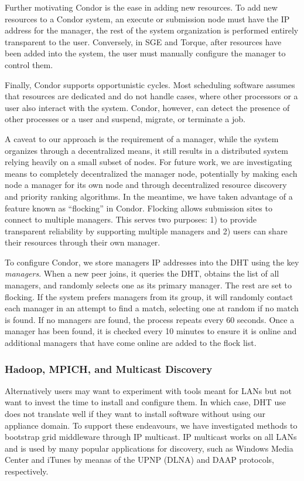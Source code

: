 \documentclass[conference]{IEEEtran}
\begin{document}
Further motivating Condor is the ease in adding new resources.  To add new
resources to a Condor system, an execute or submission node must have the IP
address for the manager, the rest of the system organization is performed
entirely transparent to the user.  Conversely, in SGE and Torque, after
resources have been added into the system, the user must manually configure the
manager to control them.

Finally, Condor supports opportunistic cycles.  Most scheduling software
assumes that resources are dedicated and do not handle cases, where other
processors or a user also interact with the system.  Condor, however, can
detect the presence of other processes or a user and suspend, migrate, or
terminate a job.

A caveat to our approach is the requirement of a manager, while the system
organizes through a decentralized means, it still results in a distributed
system relying heavily on a small subset of nodes.  For future work, we are
investigating means to completely decentralized the manager node, potentially
by making each node a manager for its own node and through decentralized
resource discovery and priority ranking algorithms.  In the meantime, we have
taken advantage of a feature known as ``flocking'' in Condor.  Flocking allows
submission sites to connect to multiple managers.  This serves two purposes: 1)
to provide transparent reliability by supporting multiple managers and 2) users
can share their resources through their own manager.  

To configure Condor, we store managers IP addresses into the DHT using the key
\emph{managers}.  When a new peer joins, it queries the DHT, obtains the list
of all managers, and randomly selects one as its primary manager.  The rest are
set to flocking.  If the system prefers managers from its group, it will
randomly contact each manager in an attempt to find a match, selecting one at
random if no match is found.  If no managers are found, the process repeats
every 60 seconds.  Once a manager has been found, it is checked every 10
minutes to ensure it is online and additional managers that have come online
are added to the flock list.

\subsubsection{Hadoop, MPICH, and Multicast Discovery}

Alternatively users may want to experiment with tools meant for LANs but not
want to invest the time to install and configure them.  In which case, DHT use
does not translate well if they want to install software without using our
appliance domain.  To support these endeavours, we have investigated methods to
bootstrap grid middleware through IP multicast.  IP multicast works on all LANs
and is used by many popular applications for discovery, such as Windows Media
Center and iTunes by meanas of the UPNP (DLNA) and DAAP protocols,
respectively.
\end{document}
